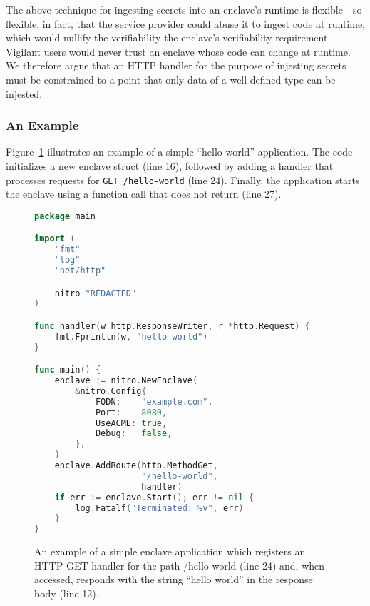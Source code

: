 The above technique for ingesting secrets into an enclave's runtime is
flexible---so flexible, in fact, that the service provider could abuse it to
ingest code at runtime, which would nullify the verifiability the enclave's
verifiability requirement.  Vigilant users would never trust an enclave whose
code can change at runtime.  We therefore argue that an HTTP handler for the
purpose of injesting secrets must be constrained to a point that only data of a
well-defined type can be injested.

\subsubsection{An Example}

Figure~\ref{fig:hello-world} illustrates an example of a simple ``hello world''
application.  The code initializes a new enclave struct (line 16), followed by
adding a handler that processes requests for \texttt{GET /hello-world} (line
24).  Finally, the application starts the enclave using a function call that
does not return (line 27).

\begin{figure}[t]
\begin{lstlisting}[language=go]
package main

import (
    "fmt"
    "log"
    "net/http"

    nitro "REDACTED"
)

func handler(w http.ResponseWriter, r *http.Request) {
    fmt.Fprintln(w, "hello world")
}

func main() {
    enclave := nitro.NewEnclave(
        &nitro.Config{
            FQDN:    "example.com",
            Port:    8080,
            UseACME: true,
            Debug:   false,
        },
    )
    enclave.AddRoute(http.MethodGet,
                     "/hello-world",
                     handler)
    if err := enclave.Start(); err != nil {
        log.Fatalf("Terminated: %v", err)
    }
}
\end{lstlisting}
\caption{An example of a simple enclave application which registers an HTTP GET
  handler for the path /hello-world (line 24) and, when accessed, responds with
  the string ``hello world'' in the response body (line 12).}
\label{fig:hello-world}
\end{figure}
